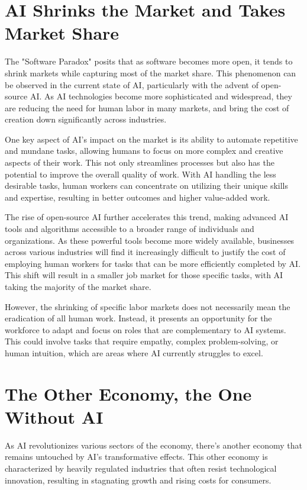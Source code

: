 \section{AI Shrinks the Market and Takes Market Share}

The "Software Paradox" posits that as software becomes more open, it tends to shrink markets while capturing most of the market share. This phenomenon can be observed in the current state of AI, particularly with the advent of open-source AI. As AI technologies become more sophisticated and widespread, they are reducing the need for human labor in many markets, and bring the cost of creation down significantly across industries.

One key aspect of AI's impact on the market is its ability to automate repetitive and mundane tasks, allowing humans to focus on more complex and creative aspects of their work. This not only streamlines processes but also has the potential to improve the overall quality of work. With AI handling the less desirable tasks, human workers can concentrate on utilizing their unique skills and expertise, resulting in better outcomes and higher value-added work.

The rise of open-source AI further accelerates this trend, making advanced AI tools and algorithms accessible to a broader range of individuals and organizations. As these powerful tools become more widely available, businesses across various industries will find it increasingly difficult to justify the cost of employing human workers for tasks that can be more efficiently completed by AI. This shift will result in a smaller job market for those specific tasks, with AI taking the majority of the market share.

However, the shrinking of specific labor markets does not necessarily mean the eradication of all human work. Instead, it presents an opportunity for the workforce to adapt and focus on roles that are complementary to AI systems. This could involve tasks that require empathy, complex problem-solving, or human intuition, which are areas where AI currently struggles to excel.

\section{The Other Economy, the One Without AI}

As AI revolutionizes various sectors of the economy, there's another economy that remains untouched by AI's transformative effects. This other economy is characterized by heavily regulated industries that often resist technological innovation, resulting in stagnating growth and rising costs for consumers.

